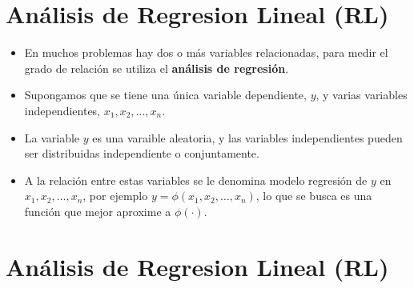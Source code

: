 
\section{An\'alisis de Regresion Lineal (RL)}



\begin{Note}
\begin{itemize}
\item En muchos problemas hay dos o m\'as variables relacionadas, para medir el grado de relaci\'on se utiliza el \textbf{an\'alisis de regresi\'on}. 
\item Supongamos que se tiene una \'unica variable dependiente, $y$, y varias  variables independientes, $x_{1},x_{2},\ldots,x_{n}$.

\item  La variable $y$ es una varaible aleatoria, y las variables independientes pueden ser distribuidas independiente o conjuntamente. 

\item A la relaci\'on entre estas variables se le denomina modelo regresi\'on de $y$ en $x_{1},x_{2},\ldots,x_{n}$, por ejemplo $y=\phi\left(x_{1},x_{2},\ldots,x_{n}\right)$, lo que se busca es una funci\'on que mejor aproxime a $\phi\left(\cdot\right)$.

\end{itemize}

\end{Note}



\section{An\'alisis de Regresion Lineal (RL)}


